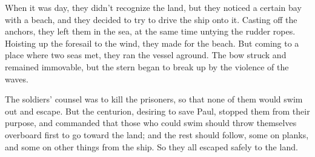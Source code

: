 {When it was day, they didn’t recognize the land, but they noticed a certain bay with a beach, and they decided to try to drive the ship onto it.
Casting off the anchors, they left them in the sea, at the same time untying the rudder ropes. Hoisting up the foresail to the wind, they made for the beach.
But coming to a place where two seas met, they ran the vessel aground. The bow struck and remained immovable, but the stern began to break up by the violence of the waves.
\par }{\PP {}The soldiers’ counsel was to kill the prisoners, so that none of them would swim out and escape.
But the centurion, desiring to save Paul, stopped them from their purpose, and commanded that those who could swim should throw themselves overboard first to go toward the land;
and the rest should follow, some on planks, and some on other things from the ship. So they all escaped safely to the land.

}
